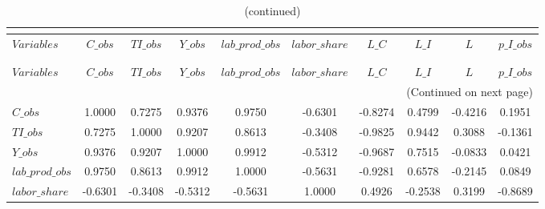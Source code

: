 
\begin{center}
\begin{longtable}{lccccccccc} 
\caption{MATRIX OF CORRELATIONS}\\
 \label{Table:th_corr_matrix}\\
\toprule 
$Variables       $	 & 	 $           C\_obs$	 & 	 $          TI\_obs$	 & 	 $           Y\_obs$	 & 	 $  lab\_prod\_obs$	 & 	 $     labor\_share$	 & 	 $             L\_C$	 & 	 $             L\_I$	 & 	 $                 L$	 & 	 $       p\_I\_obs$\\
\midrule \endfirsthead 
\caption{(continued)}\\
 \toprule \\ 
$Variables       $	 & 	 $           C\_obs$	 & 	 $          TI\_obs$	 & 	 $           Y\_obs$	 & 	 $  lab\_prod\_obs$	 & 	 $     labor\_share$	 & 	 $             L\_C$	 & 	 $             L\_I$	 & 	 $                 L$	 & 	 $       p\_I\_obs$\\
\midrule \endhead 
\midrule \multicolumn{10}{r}{(Continued on next page)} \\ \bottomrule \endfoot 
\bottomrule \endlastfoot 
$C\_obs          $	 & 	            1.0000	 & 	            0.7275	 & 	            0.9376	 & 	            0.9750	 & 	           -0.6301	 & 	           -0.8274	 & 	            0.4799	 & 	           -0.4216	 & 	            0.1951 \\ 
$TI\_obs         $	 & 	            0.7275	 & 	            1.0000	 & 	            0.9207	 & 	            0.8613	 & 	           -0.3408	 & 	           -0.9825	 & 	            0.9442	 & 	            0.3088	 & 	           -0.1361 \\ 
$Y\_obs          $	 & 	            0.9376	 & 	            0.9207	 & 	            1.0000	 & 	            0.9912	 & 	           -0.5312	 & 	           -0.9687	 & 	            0.7515	 & 	           -0.0833	 & 	            0.0421 \\ 
$lab\_prod\_obs  $	 & 	            0.9750	 & 	            0.8613	 & 	            0.9912	 & 	            1.0000	 & 	           -0.5631	 & 	           -0.9281	 & 	            0.6578	 & 	           -0.2145	 & 	            0.0849 \\ 
$labor\_share    $	 & 	           -0.6301	 & 	           -0.3408	 & 	           -0.5312	 & 	           -0.5631	 & 	            1.0000	 & 	            0.4926	 & 	           -0.2538	 & 	            0.3199	 & 	           -0.8689 \\ 

\end{longtable}
\end{center}
